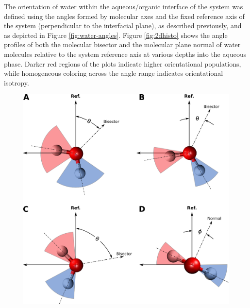 The orientation of water within the aqueous/organic interface of the system was defined using the angles formed by molecular axes and the fixed reference axis of the system (perpendicular to the interfacial plane), as described previously, and as depicted in Figure \ref{fig:water-angles}. Figure \ref{fig:2dhisto} shows the angle profiles of both the molecular bisector and the molecular plane normal of water molecules relative to the system reference axis at various depths into the aqueous phase. Darker red regions of the plots indicate higher orientational populations, while homogeneous coloring across the angle range indicates orientational isotropy.

\newcommand{\degree}{\ensuremath{^\circ}}

\begin{figure}[h!]
\begin{center}
	\includegraphics[scale=1.0]{images/h2o-angle-ranges.png}

\end{center}
\end{figure}
